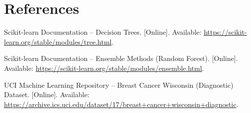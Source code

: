 \documentclass[12pt,a4paper]{article}
\begin{document}
\section{References}
\begin{enumerate}[label={[\arabic*]}]
\item Scikit-learn Documentation -- Decision Trees. [Online]. Available: \url{https://scikit-learn.org/stable/modules/tree.html}.
\item Scikit-learn Documentation -- Ensemble Methods (Random Forest). [Online]. Available: \url{https://scikit-learn.org/stable/modules/ensemble.html}.
\item UCI Machine Learning Repository -- Breast Cancer Wisconsin (Diagnostic) Dataset. [Online]. Available: \url{https://archive.ics.uci.edu/dataset/17/breast+cancer+wisconsin+diagnostic}.
\end{enumerate}
\end{document}
